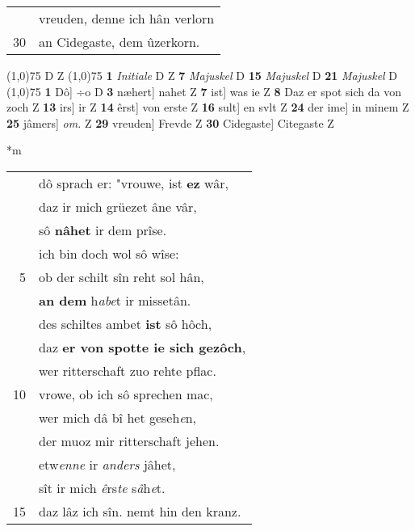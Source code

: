 \documentclass[8pt,a4paper,notitlepage]{article}
\begin{document}
\begin{table}[ht]
\begin{minipage}[t]{0.5\linewidth}
\begin{tabular}{rl}
 & vreuden, denne ich hân verlorn\\ 
30 & an Cidegaste, dem ûzerkorn.\\ 
\end{tabular}
\scriptsize
\line(1,0){75} \newline
D Z \newline
\line(1,0){75} \newline
\textbf{1} \textit{Initiale} D Z  \textbf{7} \textit{Majuskel} D  \textbf{15} \textit{Majuskel} D  \textbf{21} \textit{Majuskel} D  \newline
\line(1,0){75} \newline
\textbf{1} Dô] ÷o D \textbf{3} næhert] nahet Z \textbf{7} ist] was ie Z \textbf{8} Daz er spot sich da von zoch Z \textbf{13} irs] ir Z \textbf{14} êrst] von erste Z \textbf{16} sult] en svlt Z \textbf{24} der ime] in minem Z \textbf{25} jâmers] \textit{om.} Z \textbf{29} vreuden] Frevde Z \textbf{30} Cidegaste] Citegaste Z \newline
\end{minipage}
\hspace{0.5cm}
\begin{minipage}[t]{0.5\linewidth}
\small
\begin{center}*m
\end{center}
\begin{tabular}{rl}
 & dô sprach er: "vrouwe, ist \textbf{ez} wâr,\\ 
 & daz ir mich grüezet âne vâr,\\ 
 & sô \textbf{nâhet} ir dem prîse.\\ 
 & ich bin doch wol sô wîse:\\ 
5 & ob der schilt sîn reht sol hân,\\ 
 & \textbf{an dem} h\textit{abe}t ir missetân.\\ 
 & des schiltes ambet \textbf{ist} sô hôch,\\ 
 & daz \textbf{er von spotte ie sich gezôch},\\ 
 & wer ritterschaft zuo rehte pflac.\\ 
10 & vrowe, ob ich sô sprechen mac,\\ 
 & wer mich dâ bî het geseh\textit{e}n,\\ 
 & der muoz mir ritterschaft jehen.\\ 
 & etw\textit{enne} ir \textit{anders} jâhet,\\ 
 & sît ir mich \textit{ê}rs\textit{te} s\textit{â}h\textit{e}t.\\ 
15 & daz lâz ich sîn. nemt hin den kranz.\\ 

\end{tabular}
\end{minipage}
\end{table}
\end{document}
